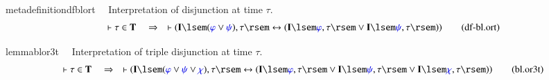 \begin{restatable}{metadefinition}{dfblort}~~ Interpretation of disjunction at time
$\tau$.
\begin{align}
\vdash \tau \in \mathbf{T}\quad\Rightarrow\quad \vdash ( \mathbf{I} \lsem (
    \mw{\varphi} \vee \mw{\psi} ) , \tau \rsem \leftrightarrow ( \mathbf{I}
    \lsem \mw{\varphi} , \tau \rsem \vee \mathbf{I} \lsem \mw{\psi} , \tau
    \rsem ) )\label{eq:df-bl.ort}\tag{df-bl.ort}
\end{align}
\end{restatable}

\begin{restatable}{lemma}{blor3t}~~ Interpretation of triple disjunction at
time $\tau$.
\begin{align}
\vdash \tau \in \mathbf{T}\quad\Rightarrow\quad \vdash ( \mathbf{I} \lsem (
    \mw{\varphi} \vee \mw{\psi} \vee \mw{\chi} ) , \tau \rsem \leftrightarrow (
    \mathbf{I} \lsem \mw{\varphi} , \tau \rsem \vee \mathbf{I} \lsem \mw{\psi}
    , \tau \rsem \vee \mathbf{I} \lsem \mw{\chi} , \tau \rsem )
    )\label{eq:bl.or3t}\tag{bl.or3t}
\end{align}
\end{restatable}

